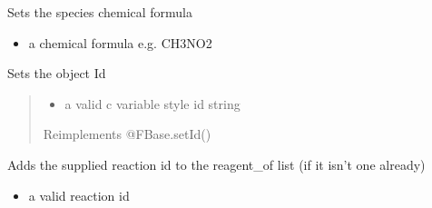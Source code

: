 \documentclass[letterpaper,10pt,english]{sphinxmanual}
\begin{document}
\begin{fulllineitems}
\begin{fulllineitems}
\begin{itemize}
\end{itemize}

\end{fulllineitems}


\begin{fulllineitems}
\label{\detokenize{modules_doc:cbmpy.CBModel.Species.setChemFormula}}
\pysigstartsignatures
{}
\pysigstopsignatures
\sphinxAtStartPar
Sets the species chemical formula
\begin{itemize}
\item {} 
\sphinxAtStartPar
{} a chemical formula e.g. CH3NO2

\end{itemize}

\end{fulllineitems}


\begin{fulllineitems}
\label{\detokenize{modules_doc:cbmpy.CBModel.Species.setId}}
\pysigstartsignatures
{}
\pysigstopsignatures
\sphinxAtStartPar
Sets the object Id
\begin{quote}
\begin{itemize}
\item {} 
\sphinxAtStartPar
{} a valid c variable style id string

\end{itemize}

\sphinxAtStartPar
Reimplements @FBase.setId()
\end{quote}

\end{fulllineitems}


\begin{fulllineitems}
\label{\detokenize{modules_doc:cbmpy.CBModel.Species.setReagentOf}}
\pysigstartsignatures
{}
\pysigstopsignatures
\sphinxAtStartPar
Adds the supplied reaction id to the reagent\_of list (if it isn’t one already)
\begin{itemize}
\item {} 
\sphinxAtStartPar
{} a valid reaction id


\end{itemize}
\end{fulllineitems}
\end{fulllineitems}
\end{document}
